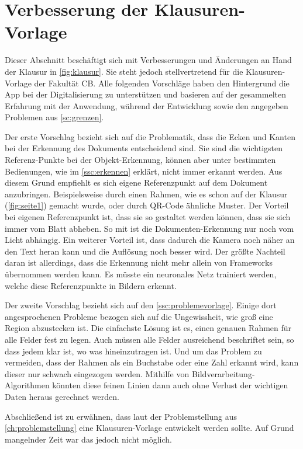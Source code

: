 \documentclass[notables, nomenclature, oneside, 150]{HSMW-Thesis}
\begin{document}

	\section{Verbesserung der Klausuren-Vorlage}\label{sc:vorlage}
		Dieser Abschnitt beschäftigt sich mit Verbesserungen und Änderungen an Hand der Klausur in \autoref{fig:klausur}. Sie steht jedoch stellvertretend für die Klausuren-Vorlage der Fakultät CB. Alle folgenden Vorschläge haben den Hintergrund die App bei der Digitalisierung zu unterstützen und basieren auf der gesammelten Erfahrung mit der Anwendung, während der Entwicklung sowie den angegeben Problemen aus \autoref{sc:grenzen}.
	
		Der erste Vorschlag bezieht sich auf die Problematik, dass die Ecken und Kanten bei der Erkennung des Dokuments entscheidend sind. Sie sind die wichtigsten Referenz-Punkte bei der Objekt-Erkennung, können aber unter bestimmten Bedienungen, wie im \autoref{ssc:erkennen} erklärt, nicht immer erkannt werden. Aus diesem Grund empfiehlt es sich eigene Referenzpunkt auf dem Dokument anzubringen. Beispielsweise durch einen Rahmen, wie es schon auf der Klausur (\ref{fig:seite1}) gemacht wurde, oder durch QR-Code ähnliche Muster. Der Vorteil bei eigenen Referenzpunkt ist, dass sie so gestaltet werden können, dass sie sich immer vom Blatt abheben. So mit ist die Dokumenten-Erkennung nur noch vom Licht abhängig. Ein weiterer Vorteil ist, dass dadurch die Kamera noch näher an den Text heran kann und die Auflösung noch besser wird. Der größte Nachteil daran ist allerdings, dass die Erkennung nicht mehr allein von Frameworks übernommen werden kann. Es müsste ein neuronales Netz trainiert werden, welche diese Referenzpunkte in Bildern erkennt. 
	
		Der zweite Vorschlag bezieht sich auf den \autoref{ssc:problemevorlage}. Einige dort angesprochenen Probleme bezogen sich auf die Ungewissheit, wie groß eine Region abzustecken ist. Die einfachste Lösung ist es, einen genauen Rahmen für alle Felder fest zu legen. Auch müssen alle Felder ausreichend beschriftet sein, so dass jedem klar ist, wo was hineinzutragen ist. Und um das Problem zu vermeiden, dass der Rahmen als ein Buchstabe oder eine Zahl erkannt wird, kann dieser nur schwach eingezogen werden. Mithilfe von Bildverarbeitung-Algorithmen könnten diese feinen Linien dann auch ohne Verlust der wichtigen Daten heraus gerechnet werden. 
		
		Abschließend ist zu erwähnen, dass laut der Problemstellung aus \autoref{ch:problemstellung} eine Klausuren-Vorlage entwickelt werden sollte. Auf Grund mangelnder Zeit war das jedoch nicht möglich. 
\end{document}
